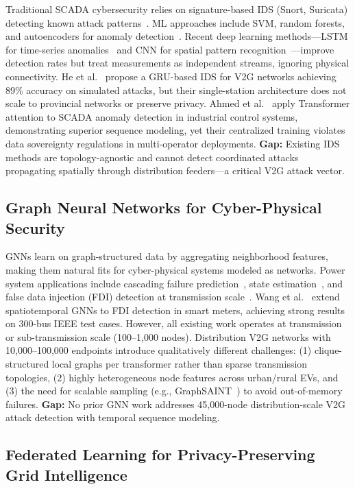 \documentclass[journal]{IEEEtran}
\begin{document}
Traditional SCADA cybersecurity relies on signature-based IDS (Snort, Suricata) detecting known attack patterns~\cite{snort}. ML approaches include SVM, random forests, and autoencoders for anomaly detection~\cite{liu2011}. Recent deep learning methods—LSTM for time-series anomalies~\cite{lstm_ids} and CNN for spatial pattern recognition~\cite{cnn_grid}—improve detection rates but treat measurements as independent streams, ignoring physical connectivity. He et al.~\cite{he_gru} propose a GRU-based IDS for V2G networks achieving 89\% accuracy on simulated attacks, but their single-station architecture does not scale to provincial networks or preserve privacy. Ahmed et al.~\cite{ahmed_transformer} apply Transformer attention to SCADA anomaly detection in industrial control systems, demonstrating superior sequence modeling, yet their centralized training violates data sovereignty regulations in multi-operator deployments. \textbf{Gap:} Existing IDS methods are topology-agnostic and cannot detect coordinated attacks propagating spatially through distribution feeders—a critical V2G attack vector.

\subsection{Graph Neural Networks for Cyber-Physical Security}

GNNs learn on graph-structured data by aggregating neighborhood features, making them natural fits for cyber-physical systems modeled as networks. Power system applications include cascading failure prediction~\cite{gnn_cascade}, state estimation~\cite{gnn_state}, and false data injection (FDI) detection at transmission scale~\cite{chen_gnn}. Wang et al.~\cite{wang_stgnn} extend spatiotemporal GNNs to FDI detection in smart meters, achieving strong results on 300-bus IEEE test cases. However, all existing work operates at transmission or sub-transmission scale (100–1,000 nodes). Distribution V2G networks with 10,000–100,000 endpoints introduce qualitatively different challenges: (1) clique-structured local graphs per transformer rather than sparse transmission topologies, (2) highly heterogeneous node features across urban/rural EVs, and (3) the need for scalable sampling (e.g., GraphSAINT~\cite{graphsaint}) to avoid out-of-memory failures. \textbf{Gap:} No prior GNN work addresses 45,000-node distribution-scale V2G attack detection with temporal sequence modeling.

\subsection{Federated Learning for Privacy-Preserving Grid Intelligence}
\end{document}
